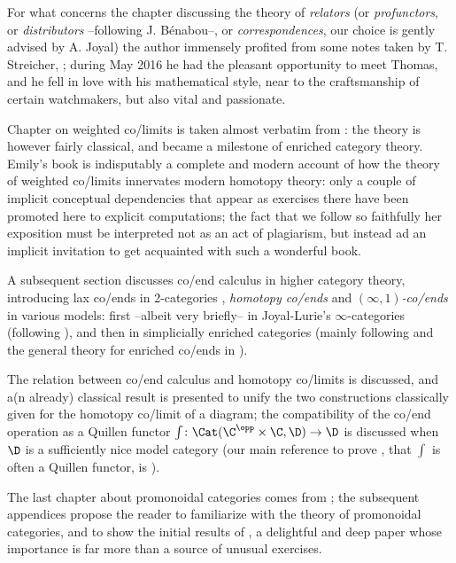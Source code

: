 For what concerns the chapter discussing the theory of \emph{relators} (or \emph{profunctors}, or \emph{distributors} --following J\@. Bénabou--, or \emph{correspondences}, our choice is gently advised by A\@. Joyal) the author immensely profited from some notes taken by T\@. Streicher, \cite{benabou2000distributors}; during May 2016 he had the pleasant opportunity to meet Thomas, and he fell in love with his mathematical style, near to the craftsmanship of certain watchmakers, but also vital and passionate.%

Chapter  on weighted co/limits is taken almost verbatim from \cite[\textbf{II.7}]{riehl2014categorical}: the theory is however fairly classical, and became a milestone of enriched category theory. Emily's book is indisputably a complete and modern account of how the theory of weighted co/limits innervates modern homotopy theory: only a couple of implicit conceptual dependencies that appear as exercises there have been promoted here to explicit computations; the fact that we follow so faithfully her exposition must be interpreted not as an act of plagiarism, but instead ad an implicit invitation to get acquainted with such a wonderful book.

A subsequent section discusses co/end calculus in higher category theory, introducing lax co/ends in 2\hyp{}categories \cite{bozapalides1977finsgen,bozapalides1975fins,bozapalides1980some}, \emph{homotopy co/ends} \cite{DrorFar98,Isaacson} and \emph{$(\infty,1)$\hyp{}co/ends} in various models: first --albeit very briefly-- in Joyal\hyp{}Lurie's $\infty$\hyp{}categories (following \cite{gepner2015lax}), and then in simplicially enriched categories (mainly following \cite{cordier1997homotopy} and the general theory for enriched co/ends in \cite{dubuc1970kan,Graya}).

The relation between co/end calculus and homotopy co/limits is discussed, and a(n already) classical result \cite{Gamb} is presented to unify the two constructions classically given for the homotopy co/limit of a diagram; the compatibility of the co/end operation as a Quillen functor $\int\colon \Cat(\C^\opp\times\C,\D)\to \D$ is discussed when $\D$ is a sufficiently nice model category (our main reference to prove , \ie that $\int$ is often a Quillen functor, is \cite[\textbf{A.2.9.28}]{HTT}).

The last chapter about promonoidal categories comes from \cite{day1974embedding, street2012monoidal}; the subsequent appendices propose the reader to familiarize with the theory of promonoidal categories, and to show the initial results of \cite[\S \textbf{1}-\textbf{3}]{day2011monoidal}, a delightful and deep paper whose importance is far more than a source of unusual exercises.

